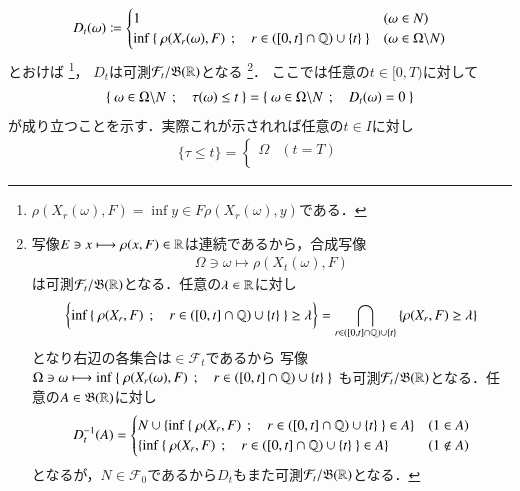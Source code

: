 	\begin{prf}
		\begin{align}
			D_t(\omega) \coloneqq 
			\begin{cases}
				1 & (\omega \in N) \\
				\operatorname*{inf}_{} \left\{\ \rho(X_r(\omega),F)\ \, ; \quad r \in ([0,t] \cap \mathbb{Q}) \cup \{t\}\ \right\} & (\omega \in \Omega \backslash N)
			\end{cases}
		\end{align}
		とおけば
		\footnote{
			$\rho(X_r(\omega),F) = \inf{y \in F}{\rho(X_r(\omega),y)}$である．
		}，
		$D_t$は可測$\mathcal{F}_t/\mathfrak{B}(\mathbb{R})$となる
		\footnote{
			写像$E \ni x \longmapsto \rho(x,F) \in \mathbb{R}$は連続であるから，合成写像
			\begin{align}
				\Omega \ni \omega \longmapsto \rho(X_t(\omega),F)
			\end{align}
			は可測$\mathcal{F}_t/\mathfrak{B}(\mathbb{R})$となる．任意の$\lambda \in \mathbb{R}$に対し
			\begin{align}
				\left\{ \operatorname*{inf}_{} \left\{\ \rho(X_r,F)\ \, ; \quad r \in ([0,t] \cap \mathbb{Q}) \cup \{t\}\ \right\} \geq \lambda \right\}
				= \bigcap_{r \in ([0,t] \cap \mathbb{Q}) \cup \{t\}} \left\{ \rho(X_r,F) \geq \lambda \right\}
			\end{align}
			となり右辺の各集合は$\in \mathcal{F}_t$であるから
			写像$\Omega \ni \omega \longmapsto \operatorname*{inf}_{} \left\{\ \rho(X_r(\omega),F)\ \, ; \quad r \in ([0,t] \cap \mathbb{Q}) \cup \{t\}\ \right\}$
			も可測$\mathcal{F}_t/\mathfrak{B}(\mathbb{R})$となる．任意の$A \in \mathfrak{B}(\mathbb{R})$に対し
			\begin{align}
				D_t^{-1}(A) = 
				\begin{cases}
					N \cup \left\{ \operatorname*{inf}_{} \left\{\ \rho(X_r,F)\ \, ; \quad r \in ([0,t] \cap \mathbb{Q}) \cup \{t\}\ \right\} \in A \right\} & (1 \in A) \\
					\left\{ \operatorname*{inf}_{} \left\{\ \rho(X_r,F)\ \, ; \quad r \in ([0,t] \cap \mathbb{Q}) \cup \{t\}\ \right\} \in A \right\} & (1 \notin A)
				\end{cases}
			\end{align}
			となるが，$N \in \mathcal{F}_0$であるから$D_t$もまた可測$\mathcal{F}_t/\mathfrak{B}(\mathbb{R})$となる．
		}．
		ここでは任意の$t \in [0,T)$に対して
		\begin{align}
			\left\{\ \omega \in \Omega \backslash N\ \, ; \quad \tau(\omega) \leq t\ \right\} = \left\{\ \omega \in \Omega \backslash N\ \, ; \quad D_t(\omega) = 0\ \right\}
			\label{eq:closed_set_stopping_time_1}
		\end{align}
		が成り立つことを示す．実際これが示されれば任意の$t \in I$に対し
		\begin{align}
			\{\tau \leq t\} =
			\begin{cases}
 				\Omega & (t = T) \\

\end{cases}
\end{align}
\end{prf}
